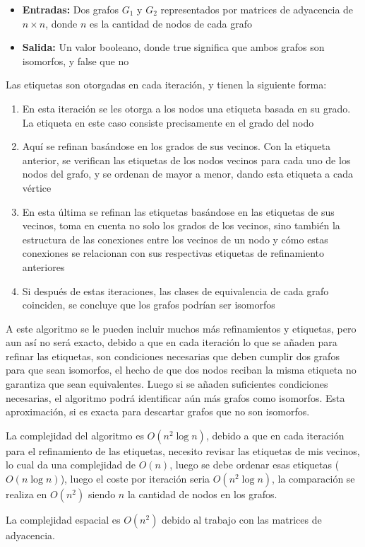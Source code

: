 \documentclass{article}
\begin{document}
\begin{itemize}
\item {\textbf{Entradas:} Dos grafos $G_1$ y $G_2$ representados por matrices de adyacencia de $n \times n$, donde $n$ es la cantidad de nodos de cada grafo}
\item {\textbf{Salida:} Un valor booleano, donde true significa que ambos grafos son isomorfos, y false que no}
\end{itemize}

Las etiquetas son otorgadas en cada iteración, y tienen la siguiente forma:
\begin{enumerate}
\item {En esta iteración se les otorga a los nodos una etiqueta basada en su grado. La etiqueta en este caso consiste precisamente en el grado del nodo}
\item {Aquí se refinan basándose en los grados de sus vecinos. Con la etiqueta anterior, se verifican las etiquetas de los nodos vecinos para cada uno de los nodos del grafo, y se ordenan de mayor a menor, dando esta etiqueta a cada vértice}
\item {En esta última se refinan las etiquetas basándose en las etiquetas de sus vecinos, toma en cuenta no solo los grados de los vecinos, sino también la estructura de las conexiones entre los vecinos de un nodo y cómo estas conexiones se relacionan con sus respectivas etiquetas de refinamiento anteriores}
\item {Si después de estas iteraciones, las clases de equivalencia de cada grafo coinciden, se concluye que los grafos podrían ser isomorfos}
\end{enumerate}

A este algoritmo se le pueden incluir muchos más refinamientos y etiquetas, pero aun así no será exacto, debido a que en cada iteración lo que se añaden para refinar las etiquetas, son condiciones necesarias que deben cumplir dos grafos para que sean isomorfos, el hecho de que dos nodos reciban la misma etiqueta no garantiza que sean equivalentes. Luego si se añaden suficientes condiciones necesarias, el algoritmo podrá identificar aún más grafos como isomorfos. Esta aproximación, si es exacta para descartar grafos que no son isomorfos.

La complejidad del algoritmo es $O(n^2 \log {n})$, debido a que en cada iteración para el refinamiento de las etiquetas, necesito revisar las etiquetas de mis vecinos, lo cual da una complejidad de $O(n)$, luego se debe ordenar esas etiquetas ($O(n\log {n})$), luego el coste por iteración seria $O(n^2\log {n})$, la comparación se realiza en $O(n^2)$ siendo $n$ la cantidad de nodos en los grafos.

La complejidad espacial es $O(n^2)$ debido al trabajo con las matrices de adyacencia.
\end{document}
